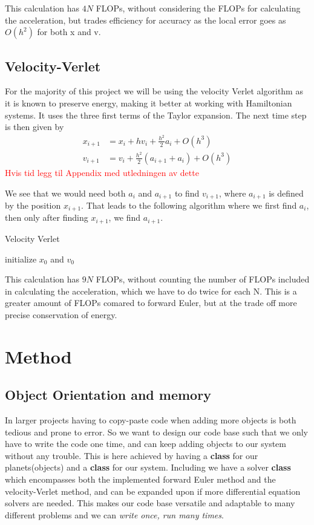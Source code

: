 \documentclass[%
reprint,
nofootinbib,
amsmath,amssymb,
aps,
]{revtex4-1}
\newcommand\todo[1]{\textcolor{red}{#1}}
\begin{document}
This calculation has $4N$ FLOPs, without considering the FLOPs for calculating the acceleration, but trades efficiency for accuracy as the local error goes as $O(h^2)$ for both x and v. 
\subsection{Velocity-Verlet}
For the majority of this project we will be using the velocity Verlet algorithm as it is known to preserve energy, making it better at working with Hamiltonian systems. It uses the three first terms of the Taylor expansion. The next time step is then given by 
\begin{align}
		x_{i+1} &= x_i + hv_i + \frac{h^2}{2} a_i + O(h^3)\\
		v_{i+1} &= v_i + \frac{h^2}{2}\left(a_{i+1} + a_i\right) + O(h^3)
\end{align}
\todo{Hvis tid legg til Appendix med utledningen av dette}

We see that we would need both $a_i$ and $a_{i+1}$ to find $v_{i+1}$, where $a_{i+1}$ is defined by the position $x_{i+1}$. That leads to the following algorithm where we first find $a_i$, then only after finding $x_{i+1}$, we find $a_{i+1}$. 
\begin{algorithm}[H]\label{algo:VV}
	\SetAlgoLined
	\caption{Velocity Verlet}
	initialize $x_0$ and $v_0$\;
\end{algorithm}

This calculation has $9N$ FLOPs, without counting the number of FLOPs included in calculating the acceleration, which we have to do twice for each N. This is a greater amount of FLOPs comared to forward Euler, but at the trade off more precise conservation of energy. 

\section{Method}
\subsection{Object Orientation and memory}
In larger projects having to copy-paste code when adding more objects is both tedious and prone to error. So we want to design our code base such that we only have to write the code one time, and can keep adding objects to our system without any trouble. This is here achieved by having a \textbf{class} for our planets(objects) and a \textbf{class} for our system. 
Including we have a solver \textbf{class} which encompasses both the implemented forward Euler method and the velocity-Verlet method, and can be expanded upon if more differential equation solvers are needed. This makes our code base versatile and adaptable to many different problems and we can \textit{write once, run many times}. 
\end{document}
